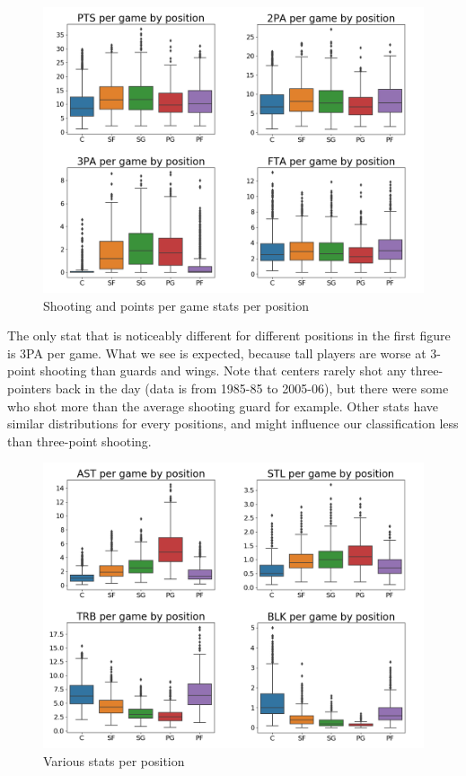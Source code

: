\documentclass[a4paper]{article}
\begin{document}
\begin{figure}[h!]
\begin{center}
\includegraphics[width=1\textwidth]{per_pos_pts_shooting.png}
\end{center}
\caption{Shooting and points per game stats per position}
\label{plt:pos_clf_data_boxplt1}
\end{figure}

The only stat that is noticeably different for different positions in the first figure is 3PA per game. What we see is expected, because tall players are worse at 3-point shooting than guards and wings. Note that centers rarely shot any three-pointers back in the day (data is from 1985-85 to 2005-06), but there were some who shot more than the average shooting guard for example. Other stats have similar distributions for every positions, and might influence our classification less than three-point shooting.

\begin{figure}[h!]
\begin{center}
\includegraphics[width=1\textwidth]{per_pos_ast_stl_trb_blk.png}
\end{center}
\caption{Various stats per position}
\label{plt:pos_clf_data_boxplt2}
\end{figure}
\end{document}
